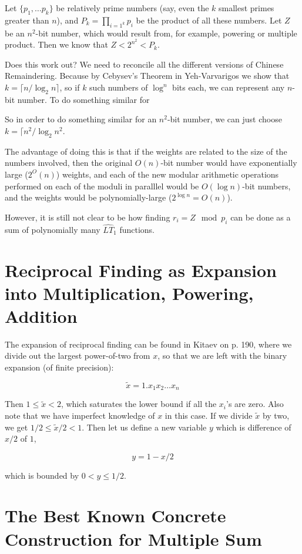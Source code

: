 \documentclass{article}
\begin{document}
Let $\{p_1, \ldots p_k\}$ be relatively prime numbers (say, even the
$k$ smallest primes greater than $n$), and
$P_k = \prod_{i=1^k} p_i$ be the product of all these numbers. Let $Z$ be
an $n^2$-bit number, which would result from, for example, powering or
multiple product. Then we know that $Z < 2^{n^2} < P_k$.

Does this work out? We need to reconcile all the different versions of
Chinese Remaindering. Because by Cebysev's Theorem in Yeh-Varvarigos we show
that $k = \lceil n / \log_2 n \rceil$, so if $k$ such numbers of $\log^n$
bits each, we can represent any $n$-bit number. To do something similar
for 

So in order to do something similar for an $n^2$-bit number, we can just 
choose $k = \lceil n^2 / \log_2 n^2$.

The advantage of doing this is that if the weights are related to the
size of the numbers involved, then the original $O(n)$-bit number would
have exponentially large ($2^O(n)$) weights, and each of the new
modular arithmetic operations performed on each of the moduli in paralllel
would be $O(\log n)$-bit numbers, and the weights would be polynomially-large
($2^{\log n} = O(n)$).

However, it is still not clear to be how finding $r_i = Z \mod p_i$ can
be done as a sum of polynomially many $\hat{LT}_1$ functions.

\section{Reciprocal Finding as Expansion into Multiplication, Powering, Addition}

The expansion of reciprocal finding can be found in Kitaev on p. 190,
where we divide out the largest power-of-two from $x$, so that we are
left with the binary expansion (of finite precision):

\begin{equation}
\tilde{x} = 1.x_1 x_2 \ldots x_n
\end{equation}

Then $1 \le \tilde{x} < 2$, which saturates the lower bound if all the
$x_i$'s are
zero. Also note that we have imperfect knowledge of $x$ in this case.
If we divide $\tilde{x}$ by two, we get $1/2 \le \tilde{x}/2 < 1$.
Then let us define a new variable $y$ which is difference of $x/2$ of $1$,

\begin{equation}
y = 1 - x/2
\end{equation}

which is bounded by $0 < y \le 1/2$.

\section{The Best Known Concrete Construction for Multiple Sum}
\end{document}
